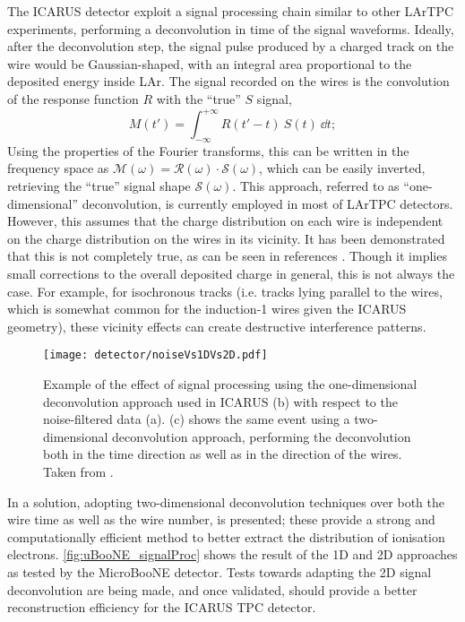 The ICARUS detector exploit a signal processing chain similar to other LArTPC experiments, performing a deconvolution in time of the signal waveforms. Ideally, after the deconvolution step, the signal pulse produced by a charged track on the wire would be Gaussian-shaped, with an integral area proportional to the deposited energy inside LAr. The signal recorded on the wires is the convolution of the response function $R$ with the ``true'' $S$ signal, \begin{equation}
    M(t') = \int_{-\infty}^{+\infty} R(t'-t)\ S(t)\ \dd t;
\end{equation} Using the properties of the Fourier transforms, this can be written in the frequency space as $\mathcal M(\omega) = \mathcal R(\omega)\cdot \mathcal S(\omega)$, which can be easily inverted, retrieving the ``true'' signal shape $\mathcal S(\omega)$. This approach, referred to as ``one-dimensional'' deconvolution, is currently employed in most of LArTPC detectors. However, this assumes that the charge distribution on each wire is independent on the charge distribution on the wires in its vicinity. It has been demonstrated that this is not completely true, as can be seen in references \cite{MicroBooNE:2018swd,MicroBooNE:2018vro}. Though it implies small corrections to the overall deposited charge in general, this is not always the case. For example, for isochronous tracks (i.e. tracks lying parallel to the wires, which is somewhat common for the induction-1 wires given the ICARUS geometry), these vicinity effects can create destructive interference patterns.

\begin{figure}
    \centering
    \texttt{[image: detector/noiseVs1DVs2D.pdf]}
    \caption[TPC signal processing]{Example of the effect of signal processing using the one-dimensional deconvolution approach used in ICARUS (b) with respect to the noise-filtered data (a). (c) shows the same event using a two-dimensional deconvolution approach, performing the deconvolution both in the time direction as well as in the direction of the wires. Taken from \cite{MicroBooNE:2018swd}. }
    \label{fig:uBooNE_signalProc}
\end{figure}

In \cite{MicroBooNE:2018swd,MicroBooNE:2018vro} a solution, adopting two-dimensional deconvolution techniques over both the wire time as well as the wire number, is presented; these provide a strong and computationally efficient method to better extract the distribution of ionisation electrons. \autoref{fig:uBooNE_signalProc} shows the result of the 1D and 2D approaches as tested by the MicroBooNE detector. Tests towards adapting the 2D signal deconvolution are being made, and once validated, should provide a better reconstruction efficiency for the ICARUS TPC detector. 

